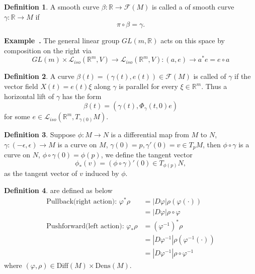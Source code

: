 \documentclass[a4paper]{article}
\theoremstyle{definition}
\newtheorem{definition}{Definition}
\theoremstyle{plain}
\newcounter{example}{Example}
\newenvironment{example}[1][]{\refstepcounter{example}\par\medskip
   \noindent \textbf{Example~\theexample. #1} \rmfamily}{\medskip}
\begin{document}
\begin{definition}
A smooth curve $\beta:\mathbb{R}\rightarrow\mathcal{F}(M)$ is called a  of smooth curve $\gamma:\mathbb{R}\rightarrow M$ if \cite{robbin}
\begin{equation*}
    \pi\circ\beta=\gamma.
\end{equation*}
\end{definition}

\begin{example}
The general linear group $GL(m,\mathbb{R})$ acts on this space by composition on the right via
\begin{equation*}
    GL(m)\times\mathcal{L}_{iso}(\mathbb{R}^m,V)\rightarrow\mathcal{L}_{iso}(\mathbb{R}^m,V):(a,e)\rightarrow a^*e=e\circ a
\end{equation*}
\end{example}

\begin{definition}
A curve $\beta(t)=(\gamma(t),e(t))\in\mathcal{F}(M)$ is called  of $\gamma$ if the vector field $X(t)=e(t)\xi$ along $\gamma$ is parallel for every $\xi\in\mathbb{R}^m$. Thus a horizontal lift of $\gamma$ has the form
\begin{equation*}
    \beta(t)=(\gamma(t),\Phi_\gamma(t,0)e)
\end{equation*}
for some $e\in\mathcal{L}_{iso}(\mathbb{R}^m,T_{\gamma(0)}M)$.
\end{definition}

\begin{definition}
Suppose $\phi:M\rightarrow N$ is a differential map from $M$ to $N$, $\gamma:(-\epsilon,\epsilon)\rightarrow M$ is a curve on $M$, $\gamma(0)=p,\gamma'(0)=v\in T_pM$, then $\phi\circ\gamma$ is a curve on $N$, $\phi\circ\gamma(0)=\phi(p)$, we define the tangent vector
\begin{equation*}
    \phi_*(v)=(\phi\circ\gamma)'(0)\in T_{\phi(p)}N,
\end{equation*}
as the  tangent vector of $v$ induced by $\phi$.
\end{definition}

\begin{definition}
 are defined as below
\begin{align*}
    \text{Pullback(right action):  }\varphi^*\rho&=|D\varphi|\rho(\varphi(\cdot))\\
    &=|D\varphi|\rho\circ\varphi\\
    \text{Pushforward(left action):  }\varphi_*\rho&=(\varphi^{-1})^*\rho\\
    &=|D\varphi^{-1}|\rho(\varphi^{-1}(\cdot))\\
    &=|D\varphi^{-1}|\rho\circ\varphi^{-1}
\end{align*}
where $(\varphi,\rho)\in\mathrm{Diff}(M)\times\mathrm{Dens}(M)$.
\end{definition}
\end{document}
